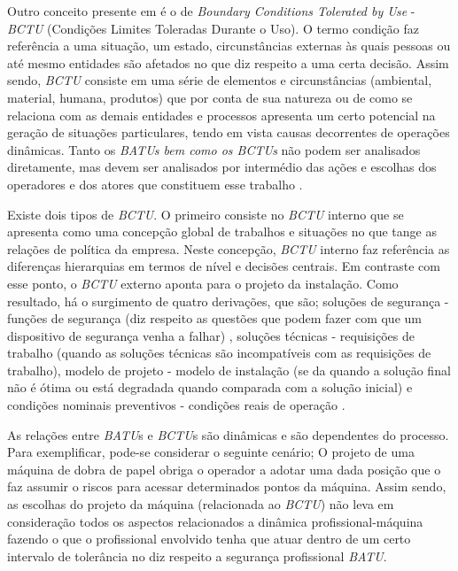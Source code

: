 Outro conceito presente em \cite{safety} é o de \textit{Boundary Conditions Tolerated by Use} - \textit{BCTU} (Condições Limites Toleradas Durante o Uso). O termo condição faz referência a uma situação, um estado, circunstâncias externas às quais pessoas ou até mesmo entidades são afetados no que diz respeito a uma certa decisão. Assim sendo, \textit{BCTU} consiste em uma série de elementos e circunstâncias (ambiental, material, humana, produtos) que por conta de sua natureza ou de como se relaciona com as demais entidades e processos apresenta um certo potencial na geração de situações particulares, tendo em vista causas decorrentes de operações dinâmicas. Tanto os \textit{BATUs bem como os BCTUs} não podem ser analisados diretamente, mas devem ser analisados por intermédio das ações e escolhas dos operadores e dos atores que constituem esse trabalho \cite{safety}. 

Existe dois tipos de \textit{BCTU}. O primeiro consiste no \textit{BCTU} interno que se apresenta como uma concepção global de trabalhos e situações no que tange as relações de política da empresa. Neste concepção, \textit{BCTU} interno faz referência as diferenças hierarquias em termos de nível e decisões centrais. Em contraste com esse ponto, o \textit{BCTU} externo aponta para o projeto da instalação. Como resultado, há o surgimento de quatro derivações, que são; soluções de segurança - funções de segurança (diz respeito as questões que podem fazer com que um dispositivo de segurança venha a falhar) , soluções técnicas - requisições de trabalho (quando as soluções técnicas são incompatíveis com as requisições de trabalho), modelo de projeto - modelo de instalação (se da quando a solução final não é ótima ou está degradada quando comparada com a solução inicial) e condições nominais preventivos - condições reais de operação
\cite{safety}.

As relações entre \textit{BATU}s e \textit{BCTU}s são dinâmicas e são dependentes do processo. Para exemplificar, pode-se considerar o seguinte cenário; O projeto de uma máquina de dobra de papel obriga o operador a adotar uma dada posição que o faz assumir o riscos para acessar determinados pontos da máquina.  Assim sendo, as escolhas do projeto da máquina (relacionada ao \textit{BCTU}) não leva em consideração todos os aspectos relacionados a dinâmica profissional-máquina fazendo o que o profissional envolvido tenha que atuar dentro de um certo intervalo de tolerância no diz respeito a segurança profissional \textit{BATU}.
